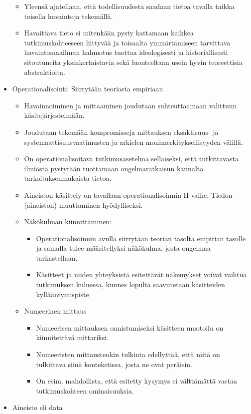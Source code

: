 \documentclass[
]{book}
\providecommand{\tightlist}{%
  \setlength{\itemsep}{0pt}\setlength{\parskip}{0pt}}
\begin{document}
\begin{itemize}
  \begin{itemize}
  \tightlist
  \item
    Yleensä ajatellaan, että todellisuudesta saadaan tietoa tavalla taikka toisella havaintoja tekemällä.
  \item
    Havaittava tieto ei mitenkään pysty kattamaan kaikkea tutkimuskohteeseen liittyvää ja toisaalta ymmärtämiseen tarvittava havaintomaailman hahmotus tuottaa ideologisesti ja historiallisesti sitoutuneita yksinkertaistavia sekä luonteeltaan usein hyvin teoreettisia abstraktioita.
  \end{itemize}
\item
  Operationalisointi: Siirrytään teoriasta empiriaan

  \begin{itemize}
  \tightlist
  \item
    Havainnoiminen ja mittaaminen joudutaan suhteuttaamaan valittuun käsitejärjestelmään.
  \item
    Joudutaan tekemään kompromisseja mittauksen eksaktisuus- ja systemaattisuusvaatimusten ja arkielen monimerkityksellisyyden välillä.
  \item
    On operationalisoitava tutkimusasetelma sellaiseksi, että tutkittavasta ilmiöstä pystytään tuottamaan ongelmaratkaisun kannalta tarkoituksenmukaista tietoa.
  \item
    Aineiston käsittely on tavallaan operationalisoinnin II vaihe. Tiedon (aineiston) muuttaminen hyödylliseksi.
  \item
    Näkökulman kiinnittäminen:

    \begin{itemize}
    \tightlist
    \item
      Operationalisoinnin avulla siirrytään teorian tasolta empirian tasolle ja samalla tulee määritellyksi näkökulma, josta ongelmaa tarkastellaan.
    \item
      Käsitteet ja niiden yhteyksistä esitettävät näkemykset voivat vaihtua tutkimuksen kuluessa, kunnes lopulta saavutetaan käsitteiden kyllääntymispiste
    \end{itemize}
  \item
    Numeerinen mittaus

    \begin{itemize}
    \tightlist
    \item
      Numeerisen mittauksen onnistumiseksi käsitteen muotoilu on kiinnitettävä mittariksi.
    \item
      Numeeristen mittaustenkin tulkinta edellyttää, että niitä on tulkittava siinä kontekstissa, josta ne ovat peräisin.
    \item
      On esim. mahdollista, että esitetty kysymys ei välttämättä vastaa tutkimuskohteen ominaisuuksia.
    \end{itemize}
  \end{itemize}
\item
  Aineisto eli data


\end{itemize}
\end{document}
